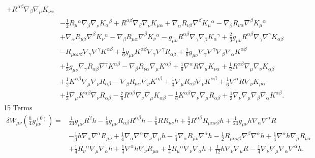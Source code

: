\documentclass[10pt,letterpaper]{article}
\begin{document}
\begin{align}
 + R^{\alpha \beta} \nabla_{\beta}\nabla_{\mu}K_{\nu \alpha}\nonumber\\
& -  \tfrac{1}{2} R_{\mu}{}^{\alpha} \nabla_{\beta}\nabla_{\nu}K_{\alpha}{}^{\beta}
 + R^{\alpha \beta} \nabla_{\beta}\nabla_{\nu}K_{\mu \alpha}
 + \nabla_{\alpha}R_{\nu \beta} \nabla^{\beta}K_{\mu}{}^{\alpha}
 -  \nabla_{\beta}R_{\nu \alpha} \nabla^{\beta}K_{\mu}{}^{\alpha}\nonumber\\
& + \nabla_{\alpha}R_{\mu \beta} \nabla^{\beta}K_{\nu}{}^{\alpha}
 -  \nabla_{\beta}R_{\mu \alpha} \nabla^{\beta}K_{\nu}{}^{\alpha}
 -  g_{\mu \nu} R^{\alpha \beta} \nabla_{\gamma}\nabla_{\beta}K_{\alpha}{}^{\gamma}
 + \tfrac{2}{3} g_{\mu \nu} R^{\alpha \beta} \nabla_{\gamma}\nabla^{\gamma}K_{\alpha \beta}\nonumber\\
& -  R_{\mu \alpha \nu \beta} \nabla_{\gamma}\nabla^{\gamma}K^{\alpha \beta}
 + \tfrac{1}{6} g_{\mu \nu} K^{\alpha \beta} \nabla_{\gamma}\nabla^{\gamma}R_{\alpha \beta}
 + \tfrac{1}{6} g_{\mu \nu} \nabla_{\gamma}\nabla^{\gamma}\nabla_{\beta}\nabla_{\alpha}K^{\alpha \beta}\nonumber\\
& + \tfrac{1}{3} g_{\mu \nu} \nabla_{\gamma}R_{\alpha \beta} \nabla^{\gamma}K^{\alpha \beta}
 -  \nabla_{\beta}R_{\nu \alpha} \nabla_{\mu}K^{\alpha \beta}
 + \tfrac{1}{6} \nabla^{\alpha}R \nabla_{\mu}K_{\nu \alpha}
 + \tfrac{1}{2} R^{\alpha \beta} \nabla_{\mu}\nabla_{\nu}K_{\alpha \beta}\nonumber\\
& + \tfrac{1}{2} K^{\alpha \beta} \nabla_{\mu}\nabla_{\nu}R_{\alpha \beta}
 -  \nabla_{\beta}R_{\mu \alpha} \nabla_{\nu}K^{\alpha \beta}
 + \tfrac{1}{3} \nabla_{\mu}R_{\alpha \beta} \nabla_{\nu}K^{\alpha \beta}
 + \tfrac{1}{6} \nabla^{\alpha}R \nabla_{\nu}K_{\mu \alpha}\nonumber\\
& + \tfrac{1}{3} \nabla_{\mu}K^{\alpha \beta} \nabla_{\nu}R_{\alpha \beta}
 -  \tfrac{7}{6} R^{\alpha \beta} \nabla_{\nu}\nabla_{\mu}K_{\alpha \beta}
 -  \tfrac{1}{6} K^{\alpha \beta} \nabla_{\nu}\nabla_{\mu}R_{\alpha \beta}
 + \tfrac{1}{3} \nabla_{\nu}\nabla_{\mu}\nabla_{\beta}\nabla_{\alpha}K^{\alpha \beta}.
\end{align}
15 Terms
\begin{align}
\delta W_{\mu\nu}(\tfrac{h}{4}g_{\mu\nu}^{(0)})={}&\tfrac{1}{24} g_{\mu \nu} R^2 h
 -  \tfrac{1}{8} g_{\mu \nu} R_{\alpha \beta} R^{\alpha \beta} h
 -  \tfrac{1}{6} R R_{\mu \nu} h
 + \tfrac{1}{2} R^{\alpha \beta} R_{\mu \alpha \nu \beta} h
 + \tfrac{1}{24} g_{\mu \nu} h \nabla_{\alpha}\nabla^{\alpha}R\nonumber\\
& -  \tfrac{1}{4} h \nabla_{\alpha}\nabla^{\alpha}R_{\mu \nu}
 + \tfrac{1}{4} \nabla_{\alpha}\nabla^{\alpha}\nabla_{\nu}\nabla_{\mu}h
 -  \tfrac{1}{4} \nabla_{\alpha}R_{\mu \nu} \nabla^{\alpha}h
 -  \tfrac{1}{2} R_{\mu \alpha \nu \beta} \nabla^{\beta}\nabla^{\alpha}h
 + \tfrac{1}{4} \nabla^{\alpha}h \nabla_{\mu}R_{\nu \alpha}\nonumber\\
& + \tfrac{1}{4} R_{\nu}{}^{\alpha} \nabla_{\mu}\nabla_{\alpha}h
 + \tfrac{1}{4} \nabla^{\alpha}h \nabla_{\nu}R_{\mu \alpha}
 + \tfrac{1}{4} R_{\mu}{}^{\alpha} \nabla_{\nu}\nabla_{\alpha}h
 + \tfrac{1}{12} h \nabla_{\nu}\nabla_{\mu}R
 -  \tfrac{1}{4} \nabla_{\nu}\nabla_{\mu}\nabla_{\alpha}\nabla^{\alpha}h.
\end{align}
\end{document}

